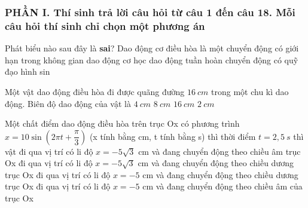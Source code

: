 \subsubsection*{PHẦN I. Thí sinh trả lời câu hỏi từ câu 1 đến câu 18. Mỗi câu hỏi thí sinh chỉ chọn một phương án}
\setcounter{ex}{0}
	\begin{ex} %
		Phát biểu nào sau đây là \textbf{sai}? Dao động cơ điều hòa là một
		\choice
		{chuyển động có giới hạn trong không gian}
		{dao động cơ học}
		{dao động tuần hoàn}
		{\True chuyển động có quỹ đạo hình sin}
	\end{ex}
	\begin{ex}%
		Một vật dao động điều hòa đi được quãng đường $16\ cm$ trong một chu kì dao động. Biên độ dao động của vật là
		\choice
		{\True $4\ cm$}
		{$8\ cm$}
		{$16\ cm$}
		{$2\ cm$}
	\end{ex}
	
	\begin{ex}%
		Một chất điểm dao động điều hòa trên trục Ox có phương trình $x=10\sin \left(2\pi t+\dfrac{\pi}{3}\right)$ (x tính bằng cm, t tính bằng s) thì thời điểm $t = 2,5\ s$ thì vật
		\choice
		{\True đi qua vị trí có li độ $x=-5\sqrt{3}$ cm và đang chuyển động theo chiều âm trục Ox}
		{đi qua vị trí có li độ $x=-5\sqrt{3}$ cm và đang chuyển động theo chiều dương trục Ox}
		{đi qua vị trí có li độ $x = - 5$ cm và đang chuyển động theo chiều dương trục Ox}
		{đi qua vị trí có li độ $x = - 5$ cm và đang chuyển động theo chiều âm của trục Ox}
	\end{ex}
	
